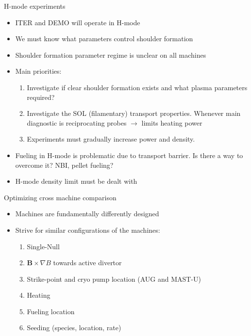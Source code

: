 \documentclass[10pt, compress]{beamer}
\begin{document}
\begin{frame}{H-mode experiments}
\begin{itemize}
	\item ITER and DEMO will operate in H-mode
	\item We must know what parameters control shoulder formation 
	\item Shoulder formation parameter regime is unclear on all machines
	\item Main priorities: 
	\begin{enumerate}
		\item Investigate if clear shoulder formation exists and what plasma parameters required? 
		\item Investigate the SOL (filamentary) transport properties.
                  Whenever main diagnostic is reciprocating probes $\rightarrow$ limits heating power
		\item Experiments must gradually increase power and density. 
	\end{enumerate}
	\item Fueling in H-mode is problematic due to transport
          barrier. Is there a way to overcome it? NBI, pellet fueling?
	\item H-mode density limit \parencite{Bernert:2015bq} must be dealt with
\end{itemize}

\end{frame}


\begin{frame}{Optimizing cross machine comparison}
\begin{itemize}
	\item Machines are fundamentally differently designed
	\item Strive for similar configurations of the machines:
	\begin{enumerate} 
		\item Single-Null
		\item $\bm{B} \times \nabla B$ towards active divertor 
		\item Strike-point and cryo pump location (AUG and MAST-U)
		\item Heating 
		\item Fueling location 
		\item Seeding (species, location, rate)
	\end{enumerate}
\end{itemize} 


\end{frame}
\end{document}
